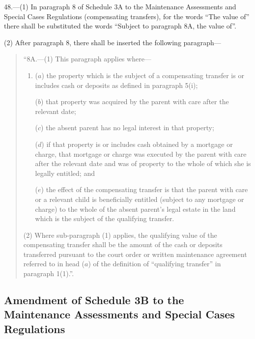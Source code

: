 \documentclass[12pt,a4paper]{article}
\begin{document}
48.—(1) In paragraph 8 of Schedule 3A to the Maintenance Assessments and Special Cases Regulations (compensating transfers), for the words “The value of” there shall be substituted the words “Subject to paragraph 8A, the value of”.

(2) After paragraph 8, there shall be inserted the following paragraph—
\begin{quotation}
“8A.—(1) This paragraph applies where—
\begin{enumerate}\item[]
($a$) the property which is the subject of a compensating transfer is or includes cash or deposits as defined in paragraph 5(i);

($b$) that property was acquired by the parent with care after the relevant date;

($c$) the absent parent has no legal interest in that property;

($d$) if that property is or includes cash obtained by a mortgage or charge, that mortgage or charge was executed by the parent with care after the relevant date and was of property to the whole of which she is legally entitled; and

($e$) the effect of the compensating transfer is that the parent with care or a relevant child is beneficially entitled (subject to any mortgage or charge) to the whole of the absent parent’s legal estate in the land which is the subject of the qualifying transfer.
\end{enumerate}

(2) Where sub-paragraph (1) applies, the qualifying value of the compensating transfer shall be the amount of the cash or deposits transferred pursuant to the court order or written maintenance agreement referred to in head ($a$) of the definition of “qualifying transfer” in paragraph 1(1).”.
\end{quotation}

\subsection[49. Amendment of Schedule 3B to the Maintenance Assessments and Special Cases Regulations]{Amendment of Schedule 3B to the Maintenance Assessments and Special Cases Regulations}
\end{document}
